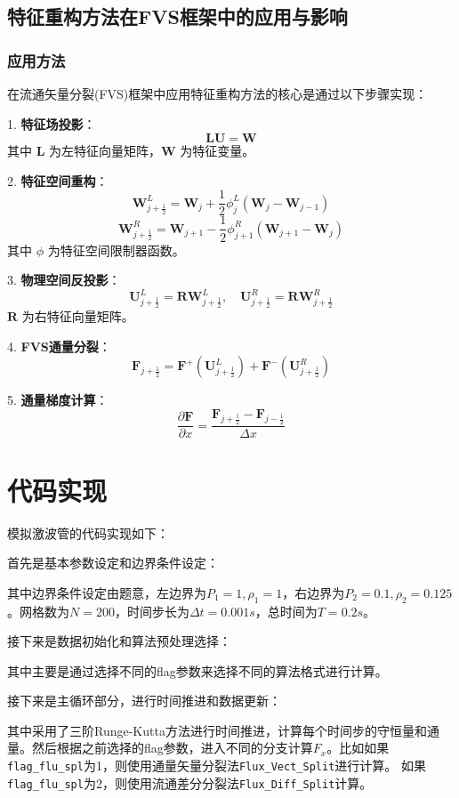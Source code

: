 \documentclass[12pt,a4paper]{article}
\begin{document}
\subsection{特征重构方法在FVS框架中的应用与影响}
\subsubsection{应用方法}
在流通矢量分裂(FVS)框架中应用特征重构方法的核心是通过以下步骤实现：

1. \textbf{特征场投影}：
   $$
   \mathbf{L}\mathbf{U} = \mathbf{W}
   $$
   其中 $\mathbf{L}$ 为左特征向量矩阵，$\mathbf{W}$ 为特征变量。

2. \textbf{特征空间重构}：
   $$
   \mathbf{W}_{j+\frac{1}{2}}^L = \mathbf{W}_j + \frac{1}{2}\phi_j^L(\mathbf{W}_j - \mathbf{W}_{j-1})
   $$
   $$
   \mathbf{W}_{j+\frac{1}{2}}^R = \mathbf{W}_{j+1} - \frac{1}{2}\phi_{j+1}^R(\mathbf{W}_{j+1} - \mathbf{W}_j)
   $$
   其中 $\phi$ 为特征空间限制器函数。

3. \textbf{物理空间反投影}：
   $$
   \mathbf{U}_{j+\frac{1}{2}}^L = \mathbf{R}\mathbf{W}_{j+\frac{1}{2}}^L, \quad
   \mathbf{U}_{j+\frac{1}{2}}^R = \mathbf{R}\mathbf{W}_{j+\frac{1}{2}}^R
   $$
   $\mathbf{R}$ 为右特征向量矩阵。

4. \textbf{FVS通量分裂}：
   $$
   \mathbf{F}_{j+\frac{1}{2}} = \mathbf{F}^+(\mathbf{U}_{j+\frac{1}{2}}^L) + \mathbf{F}^-(\mathbf{U}_{j+\frac{1}{2}}^R)
   $$

5. \textbf{通量梯度计算}：
   $$
   \frac{\partial\mathbf{F}}{\partial x} = \frac{\mathbf{F}_{j+\frac{1}{2}} - \mathbf{F}_{j-\frac{1}{2}}}{\Delta x}
   $$


\section{代码实现}
模拟激波管的代码实现如下：

首先是基本参数设定和边界条件设定：

其中边界条件设定由题意，左边界为$P_1=1, \rho_1=1$，右边界为$P_2=0.1, \rho_2=0.125$。网格数为$N=200$，时间步长为$\Delta t=0.001s$，总时间为$T=0.2s$。

接下来是数据初始化和算法预处理选择：

其中主要是通过选择不同的flag参数来选择不同的算法格式进行计算。

接下来是主循环部分，进行时间推进和数据更新：

其中采用了三阶Runge-Kutta方法进行时间推进，计算每个时间步的守恒量和通量。然后根据之前选择的flag参数，进入不同的分支计算$F_x$。比如如果\texttt{flag\_flu\_spl}为1，则使用通量矢量分裂法\texttt{Flux\_Vect\_Split}进行计算。
如果\texttt{flag\_flu\_spl}为2，则使用流通差分分裂法\texttt{Flux\_Diff\_Split}计算。
\end{document}
